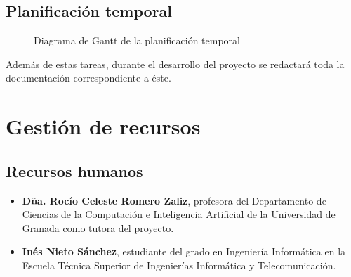 \subsection{Planificación temporal}
\begin{figure}[H]
    \caption{Diagrama de Gantt de la planificación temporal}
    \label{fig:gantt}
\end{figure}

Además de estas tareas, durante el desarrollo del proyecto se redactará toda la documentación correspondiente a éste.

\section{Gestión de recursos} \label{recursos}
\subsection{Recursos humanos}
\begin{itemize}
    \item \textbf{Dña. Rocío Celeste Romero Zaliz}, profesora del Departamento de Ciencias de la Computación e Inteligencia Artificial de la Universidad de Granada como tutora del proyecto.
    \item \textbf{Inés Nieto Sánchez}, estudiante del grado en Ingeniería Informática en la Escuela Técnica Superior de Ingenierías Informática y Telecomunicación.
\end{itemize}

